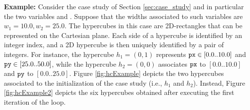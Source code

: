 \textbf{Example:} Consider the case study of Section \ref{sec:case_study} and in particular the two variables  and . Suppose that the widths associated to such variables are $w_1 = 10.0, w_2 = 25.0$. The hypercubes in this case are 2D-rectangles that can be represented on the Cartesian plane.
Each side of a hypercube is identified by an integer index, and a 2D hypercube is then uniquely identified by a pair of integers. For instance, the hypercube $h_1 = ( 0, 1 )$ represents $\mathtt{px} \in [0.0 .. 10.0]$ and $\mathtt{py} \in [25.0 .. 50.0]$, while the hypercube $h_2 = ( 0, 0 )$  associates $\mathtt{px}$ to $[0.0 .. 10.0]$ and $\mathtt{py}$ to $[0.0 .. 25.0]$. Figure \ref{fig:hcExample} depicts the two hypercubes associated to the initialization of the case study (i.e., $h_1$ and $h_2$). Instead, Figure \ref{fig:hcExample2} depicts the six hypercubes obtained after executing the first iteration of the  loop.

